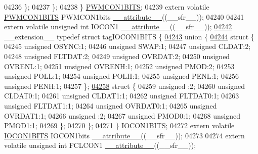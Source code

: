 \begin{DoxyCode}
04236     \};
04237   \};
04238 \} \hyperlink{a00014_da/d31/a00678}{PWMCON1BITS};
04239 \textcolor{keyword}{extern} \textcolor{keyword}{volatile} \hyperlink{a00014_da/d31/a00678}{PWMCON1BITS} PWMCON1bits \hyperlink{a00015_a493c46f03454991ccc5aa7a6e1dfb2a7}{\_\_attribute\_\_}((\_\_sfr\_\_));
04240 
04241 \textcolor{keyword}{extern} \textcolor{keyword}{volatile} \textcolor{keywordtype}{unsigned} \textcolor{keywordtype}{int}  IOCON1 \hyperlink{a00015_a493c46f03454991ccc5aa7a6e1dfb2a7}{\_\_attribute\_\_}((\_\_sfr\_\_));
\hypertarget{a00015_source_l04242}{}\hyperlink{a00014}{04242} \_\_extension\_\_ \textcolor{keyword}{typedef} \textcolor{keyword}{struct }tagIOCON1BITS \{
\hypertarget{a00015_source_l04243}{}\hyperlink{a00015}{04243}   \textcolor{keyword}{union }\{
\hypertarget{a00015_source_l04244}{}\hyperlink{a00015}{04244}     \textcolor{keyword}{struct }\{
04245       \textcolor{keywordtype}{unsigned} OSYNC:1;
04246       \textcolor{keywordtype}{unsigned} SWAP:1;
04247       \textcolor{keywordtype}{unsigned} CLDAT:2;
04248       \textcolor{keywordtype}{unsigned} FLTDAT:2;
04249       \textcolor{keywordtype}{unsigned} OVRDAT:2;
04250       \textcolor{keywordtype}{unsigned} OVRENL:1;
04251       \textcolor{keywordtype}{unsigned} OVRENH:1;
04252       \textcolor{keywordtype}{unsigned} PMOD:2;
04253       \textcolor{keywordtype}{unsigned} POLL:1;
04254       \textcolor{keywordtype}{unsigned} POLH:1;
04255       \textcolor{keywordtype}{unsigned} PENL:1;
04256       \textcolor{keywordtype}{unsigned} PENH:1;
04257     \};
\hypertarget{a00015_source_l04258}{}\hyperlink{a00015}{04258}     \textcolor{keyword}{struct }\{
04259       \textcolor{keywordtype}{unsigned} :2;
04260       \textcolor{keywordtype}{unsigned} CLDAT0:1;
04261       \textcolor{keywordtype}{unsigned} CLDAT1:1;
04262       \textcolor{keywordtype}{unsigned} FLTDAT0:1;
04263       \textcolor{keywordtype}{unsigned} FLTDAT1:1;
04264       \textcolor{keywordtype}{unsigned} OVRDAT0:1;
04265       \textcolor{keywordtype}{unsigned} OVRDAT1:1;
04266       \textcolor{keywordtype}{unsigned} :2;
04267       \textcolor{keywordtype}{unsigned} PMOD0:1;
04268       \textcolor{keywordtype}{unsigned} PMOD1:1;
04269     \};
04270   \};
04271 \} \hyperlink{a00014_d6/d52/a00510}{IOCON1BITS};
04272 \textcolor{keyword}{extern} \textcolor{keyword}{volatile} \hyperlink{a00014_d6/d52/a00510}{IOCON1BITS} IOCON1bits \hyperlink{a00015_a493c46f03454991ccc5aa7a6e1dfb2a7}{\_\_attribute\_\_}((\_\_sfr\_\_));
04273 
04274 \textcolor{keyword}{extern} \textcolor{keyword}{volatile} \textcolor{keywordtype}{unsigned} \textcolor{keywordtype}{int}  FCLCON1 \hyperlink{a00015_a493c46f03454991ccc5aa7a6e1dfb2a7}{\_\_attribute\_\_}((\_\_sfr\_\_));

\end{DoxyCode}
